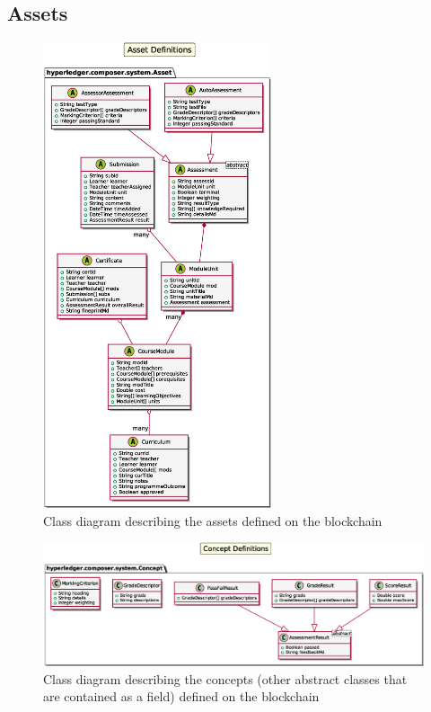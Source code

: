\subsection{Assets}
\begin{figure}[!ht] 
    \centering    
    \includegraphics[width=0.6\textwidth]{assets}
    \caption[Assets Class Diagram]
        {Class diagram describing the assets defined on the blockchain} 
    \label{fig:assets}
\end{figure}

\begin{figure}[!ht] 
    \centering    
    \includegraphics[width=1.0\textwidth]{concepts}
    \caption[Concepts Class Diagram]
        {Class diagram describing the concepts (other abstract classes that are contained as a field) defined on the blockchain} 
    \label{fig:concepts}
\end{figure}

